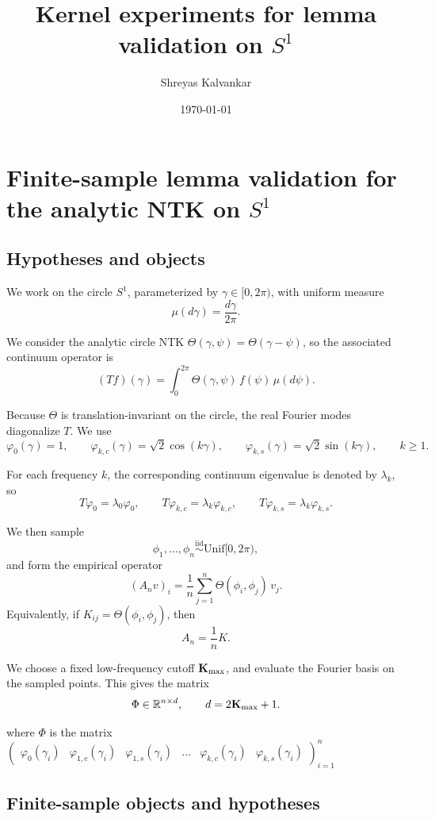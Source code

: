 \documentclass[11pt]{article}
\title{Kernel experiments for lemma validation on $S^1$}
\author{Shreyas Kalvankar}
\date{\today}
\begin{document}
\maketitle

\section{Finite-sample lemma validation for the analytic NTK on $S^1$}

\subsection{Hypotheses and objects}

We work on the circle $S^1$, parameterized by $\gamma \in [0,2\pi)$, with uniform measure
$$
	\mu(d\gamma)=\frac{d\gamma}{2\pi}.
$$

We consider the analytic circle NTK $\Theta(\gamma,\psi)=\Theta(\gamma-\psi)$, so the associated continuum operator is
$$
	(Tf)(\gamma)=\int_0^{2\pi}\Theta(\gamma,\psi)\,f(\psi)\,\mu(d\psi).
$$

Because $\Theta$ is translation-invariant on the circle, the real Fourier modes diagonalize $T$. We use
$$
	\varphi_0(\gamma)=1,\qquad
	\varphi_{k,c}(\gamma)=\sqrt{2}\cos(k\gamma),\qquad
	\varphi_{k,s}(\gamma)=\sqrt{2}\sin(k\gamma),\qquad k\ge 1.
$$

For each frequency $k$, the corresponding continuum eigenvalue is denoted by $\lambda_k$, so
$$
	T\varphi_0=\lambda_0\varphi_0,\qquad
	T\varphi_{k,c}=\lambda_k\varphi_{k,c},\qquad
	T\varphi_{k,s}=\lambda_k\varphi_{k,s}.
$$

We then sample
$$
	\phi_1,\dots,\phi_n \overset{\mathrm{iid}}{\sim} \mathrm{Unif}[0,2\pi),
$$
and form the empirical operator
$$
	(A_n v)_i=\frac{1}{n}\sum_{j=1}^n \Theta(\phi_i,\phi_j)\,v_j.
$$
Equivalently, if $K_{ij}=\Theta(\phi_i,\phi_j)$, then
$$
	A_n=\frac{1}{n}K.
$$

We choose a fixed low-frequency cutoff $\bold K_{\max}$, and evaluate the Fourier basis on the sampled points. This gives the matrix
$$
	\Phi\in\mathbb{R}^{n\times d},\qquad d=2\bold K_{\max}+1.
$$

where $\Phi$ is the matrix $\begin{pmatrix} \varphi_0(\gamma_i) & \varphi_{1,c}(\gamma_i) & \varphi_{1,s}(\gamma_i) & \dots & \varphi_{k,c}(\gamma_i) & \varphi_{k,s}(\gamma_i) \end{pmatrix}_{i=1}^n$

\subsection{Finite-sample objects and hypotheses}
\end{document}
